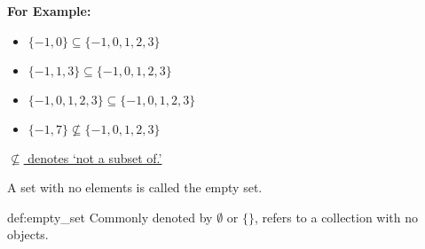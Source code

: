 \noindent
\textbf{For Example:}
\begin{itemize}
    \item $\{-1, 0\} \subseteq \{-1, 0, 1, 2, 3\}$
    \item $\{-1, 1, 3\} \subseteq \{-1, 0, 1, 2, 3\}$
    \item $\{-1, 0, 1, 2, 3\} \subseteq \{-1, 0, 1, 2, 3\}$
    \item $\{-1, 7\} \not\subseteq \{-1, 0, 1, 2, 3\}$
\end{itemize}

\underline{$\not\subseteq$ denotes `not a subset of.'}

\vspace{1em}

\noindent
A set with no elements is called the empty set.
\begin{Def}{def:empty_set}
    Commonly denoted by $\emptyset$ or $\{\}$, refers to a collection with no objects.
\end{Def}


